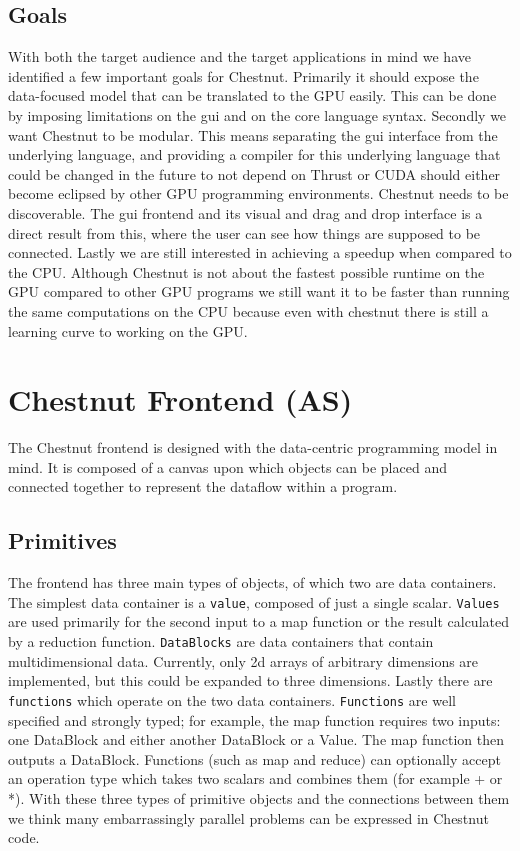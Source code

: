\documentclass[twocolumn]{article}
\renewcommand{\|}{\origbar} %
\newcommand{\code}[1]{\texttt{#1}}
\begin{document}
\subsection{Goals}

With both the target audience and the target applications in mind we have identified a few important goals for Chestnut. Primarily it should expose the data-focused model that can be translated to the GPU easily. This can be done by imposing limitations on the gui and on the core language syntax. Secondly we want Chestnut to be modular. This means separating the gui interface from the underlying language, and providing a compiler for this underlying language that could be changed in the future to not depend on Thrust or CUDA should either become eclipsed by other GPU programming environments. Chestnut needs to be discoverable. The gui frontend and its visual and drag and drop interface is a direct result from this, where the user can see how things are supposed to be connected. Lastly we are still interested in achieving a speedup when compared to the CPU. Although Chestnut is not about the fastest possible runtime on the GPU compared to other GPU programs we still want it to be faster than running the same computations on the CPU because even with chestnut there is still a learning curve to working on the GPU.

\section{Chestnut Frontend (AS)}
\label{sec:chestnutFrontend}

The Chestnut frontend is designed with the data-centric programming model in mind. It is composed of a canvas upon which objects can be placed and connected together to represent the dataflow within a program.

\subsection{Primitives}

The frontend has three main types of objects, of which two are data containers. The simplest data container is a \code{value}, composed of just a single scalar. \code{Values} are used primarily for the second input to a map function or the result calculated by a reduction function. \code{DataBlocks} are data containers that contain multidimensional data. Currently, only 2d arrays of arbitrary dimensions are implemented, but this could be expanded to three dimensions. Lastly there are \code{functions} which operate on the two data containers. \code{Functions} are well specified and strongly typed; for example, the map function requires two inputs: one DataBlock and either another DataBlock or a Value. The map function then outputs a DataBlock. Functions (such as map and reduce) can optionally accept an operation type which takes two scalars and combines them (for example + or *). With these three types of primitive objects and the connections between them we think many embarrassingly parallel problems can be expressed in Chestnut code.
\end{document}
